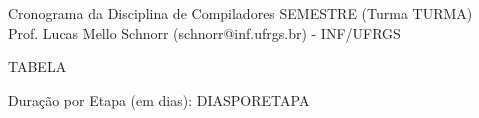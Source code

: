 \documentclass[11pt,portuguese,]{article}
\begin{document}
\begin{center}
  {\LARGE Cronograma da Disciplina de Compiladores SEMESTRE (Turma TURMA)} \\
  Prof. Lucas Mello Schnorr (schnorr@inf.ufrgs.br) - INF/UFRGS
\end{center}

TABELA

\begin{center}
Duração por Etapa (em dias):  DIASPORETAPA
\end{center}
\end{document}
